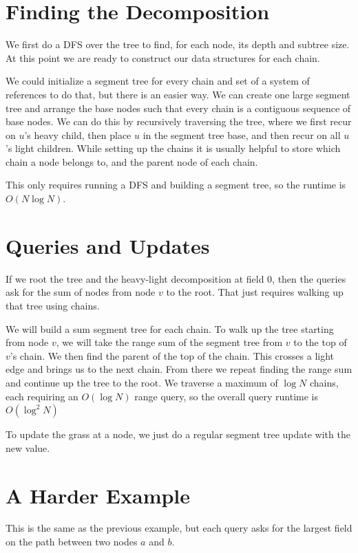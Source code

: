 \documentclass{article}
\begin{document}
\section{Finding the Decomposition}

We first do a DFS over the tree to find, for each node, its depth and subtree size.  At this point we are ready to construct our data structures for each chain.

We could initialize a segment tree for every chain and set of a system of references to do that, but there is an easier way.  We can create one large segment tree and arrange the base nodes such that every chain is a contiguous sequence of base nodes.  We can do this by recursively traversing the tree, where we first recur on $u$'s heavy child, then place $u$ in the segment tree base, and then recur on all $u$'s light children.  While setting up the chains it is usually helpful to store which chain a node belongs to, and the parent node of each chain.

This only requires running a DFS and building a segment tree, so the runtime is $O(N \log N)$.

\section{Queries and Updates}

If we root the tree and the heavy-light decomposition at field 0, then the queries ask for the sum of nodes from node $v$ to the root.  That just requires walking up that tree using chains.  

We will build  a sum segment tree for each chain.  To walk up the tree starting from node $v$, we will take the range sum of the segment tree from $v$ to the top of $v$'s chain.  We then find the parent of the top of the chain.  This crosses a light edge and brings us to the next chain.  From there we repeat finding the range sum and continue up the tree to the root.  We traverse a maximum of $\log N$ chains, each requiring an $O(\log N)$ range query, so the overall query runtime is $O(\log^2 N)$

To update the grass at a node, we just do a regular segment tree update with the new value.

\section{A Harder Example}

This is the same as the previous example, but each query asks for the largest field on the path between two nodes $a$ and $b$.
\end{document}
